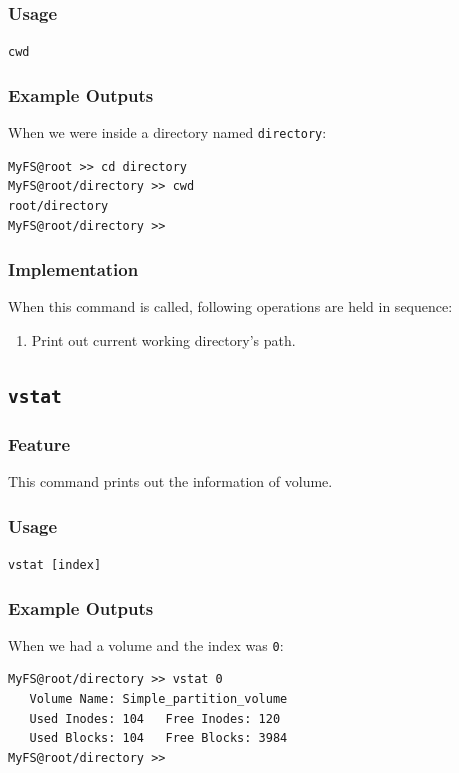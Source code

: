 \documentclass{homework}
\begin{document}
\subsubsection{Usage}
\begin{center}
\texttt{cwd}
\end{center}

\subsubsection{Example Outputs}
When we were inside a directory named \texttt{directory}:
\\
\begin{center}
\begin{code}
\begin{verbatim}
MyFS@root >> cd directory
MyFS@root/directory >> cwd
root/directory
MyFS@root/directory >>
\end{verbatim}
\end{code}
\end{center}

\subsubsection{Implementation}
When this command is called, following operations are held in sequence:
\begin{enumerate}
    \item Print out current working directory's path.
\end{enumerate}

\subsection{\texttt{vstat}}
\subsubsection{Feature}
This command prints out the information of volume.
\subsubsection{Usage}
\begin{center}
\texttt{vstat [index]}
\end{center}

\subsubsection{Example Outputs}
When we had a volume and the index was \texttt{0}:
\\
\begin{center}
\begin{code}
\begin{verbatim}
MyFS@root/directory >> vstat 0
   Volume Name: Simple_partition_volume
   Used Inodes: 104   Free Inodes: 120
   Used Blocks: 104   Free Blocks: 3984
MyFS@root/directory >>
\end{verbatim}
\end{code}
\end{center}
\end{document}

